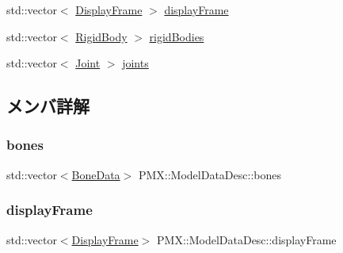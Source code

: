 \begin{DoxyCompactItemize}
\item 
std\+::vector$<$ \mbox{\hyperlink{struct_p_m_x_1_1_display_frame}{Display\+Frame}} $>$ \mbox{\hyperlink{struct_p_m_x_1_1_model_data_desc_a0ba429d52fd5b63bb11b7c89dd1787cf}{display\+Frame}}
\item 
std\+::vector$<$ \mbox{\hyperlink{struct_p_m_x_1_1_rigid_body}{Rigid\+Body}} $>$ \mbox{\hyperlink{struct_p_m_x_1_1_model_data_desc_acaf47c6a725110c90e3a59f5089b03d7}{rigid\+Bodies}}
\item 
std\+::vector$<$ \mbox{\hyperlink{struct_p_m_x_1_1_joint}{Joint}} $>$ \mbox{\hyperlink{struct_p_m_x_1_1_model_data_desc_ae5e3126a09a5d036046f534f290408cd}{joints}}
\end{DoxyCompactItemize}


\subsection{メンバ詳解}
\mbox{\label{struct_p_m_x_1_1_model_data_desc_a05537dc8d57924b4d524dc313f6dae2e}} 
\subsubsection{\texorpdfstring{bones}{bones}}
{\footnotesize\ttfamily std\+::vector$<$\mbox{\hyperlink{struct_p_m_x_1_1_bone_data}{Bone\+Data}}$>$ P\+M\+X\+::\+Model\+Data\+Desc\+::bones}

\mbox{\label{struct_p_m_x_1_1_model_data_desc_a0ba429d52fd5b63bb11b7c89dd1787cf}} 
\subsubsection{\texorpdfstring{display\+Frame}{displayFrame}}
{\footnotesize\ttfamily std\+::vector$<$\mbox{\hyperlink{struct_p_m_x_1_1_display_frame}{Display\+Frame}}$>$ P\+M\+X\+::\+Model\+Data\+Desc\+::display\+Frame}

\mbox{\label{struct_p_m_x_1_1_model_data_desc_a1ead04540b79398f2ae7853298146830}} 
